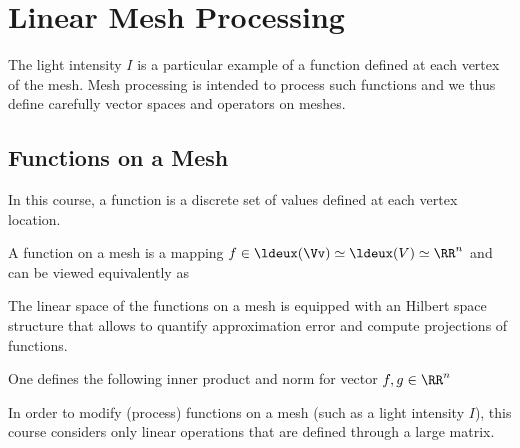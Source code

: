 \section{Linear Mesh Processing}

The light intensity $I$ is a particular example of a function defined at each vertex of the mesh. Mesh processing is intended to process such functions and we thus define carefully vector spaces and operators on meshes.

\subsection{Functions on a Mesh}

In this course, a function is a discrete set of values defined at each vertex location.

\begin{defn} A function on a mesh is a mapping $f \in \ldeux(\Vv) \simeq \ldeux(V) \simeq \RR^n$ and can be viewed equivalently as 
\end{defn}

The linear space of the functions on a mesh is equipped with an Hilbert space structure that allows to quantify approximation error and compute projections of functions.

\begin{defn} One defines the following inner product and norm for vector $f,g \in \RR^n$
\end{defn}

In order to modify (process) functions on a mesh (such as a light intensity $I$), this course considers only linear operations that are defined through a large matrix.

